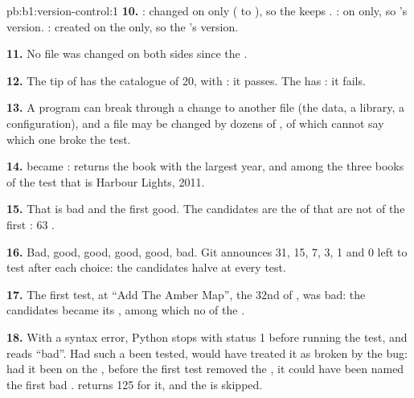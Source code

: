 \begin{solution}{pb:b1:version-control:1}
\textbf{10.} : changed on  only ( to ), so the  keeps
. : on  only, so 's version. : created on the 
only, so the 's version.

\textbf{11.} No file was changed on both sides since the .

\textbf{12.} The tip of  has the catalogue of  20, with : it passes. The  has
: it fails.

\textbf{13.} A program can break through a change to another file (the data, a library, a configuration), and a file may
be changed by dozens of , of which  cannot say which one broke the test.

\textbf{14.}  became :  returns the book with the largest year, and among the three
books of the test that is Harbour Lights, 2011.

\textbf{15.} That  is bad and the first  good. The candidates are the  of  that are
not  of the first : 63 .

\textbf{16.} Bad, good, good, good, good, bad. Git announces 31, 15, 7, 3, 1 and 0  left to test after each
choice: the candidates halve at every test.

\textbf{17.} The first test, at ``Add The Amber Map'', the 32nd  of , was bad: the candidates became its
, among which no  of the .

\textbf{18.} With a syntax error, Python stops with status 1 before running the test, and  reads ``bad''.
Had such a  been tested,  would have treated it as broken by the bug: had it been on the , before
the first test removed the , it could have been named the first bad .  returns 125 for it,
and the  is skipped.


\end{solution}
